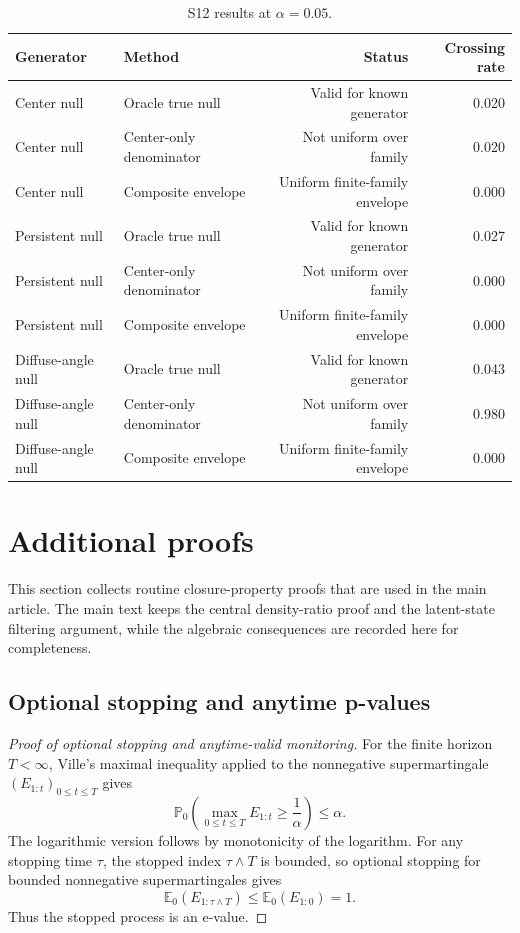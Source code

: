 \documentclass[pdflatex,sn-basic]{sn-jnl}
\newcommand{\E}{\mathbb E}
\newcommand{\Pbb}{\mathbb P}
\newcommand{\1}{\mathbf 1}
\begin{document}
\begin{table}[h]
\centering
\footnotesize
\begin{tabular}{@{}llrr@{}}
\toprule
Generator & Method & Status & Crossing rate \\
\midrule
Center null & Oracle true null & Valid for known generator & 0.020 \\
Center null & Center-only denominator & Not uniform over family & 0.020 \\
Center null & Composite envelope & Uniform finite-family envelope & 0.000 \\
Persistent null & Oracle true null & Valid for known generator & 0.027 \\
Persistent null & Center-only denominator & Not uniform over family & 0.000 \\
Persistent null & Composite envelope & Uniform finite-family envelope & 0.000 \\
Diffuse-angle null & Oracle true null & Valid for known generator & 0.043 \\
Diffuse-angle null & Center-only denominator & Not uniform over family & 0.980 \\
Diffuse-angle null & Composite envelope & Uniform finite-family envelope & 0.000 \\
\bottomrule
\end{tabular}
\caption{S12 results at $\alpha=0.05$.}
\label{tab:supp_s12}
\end{table}

\section{Additional proofs}
\label{sec:supp_proofs}

This section collects routine closure-property proofs that are used in the main article. The main text keeps the central density-ratio proof and the latent-state filtering argument, while the algebraic consequences are recorded here for completeness.

\subsection{Optional stopping and anytime p-values}

\begin{proof}[Proof of optional stopping and anytime-valid monitoring]
For the finite horizon $T<\infty$, Ville's maximal inequality applied to the nonnegative supermartingale $(E_{1:t})_{0\leq t\leq T}$ gives
\[
 \Pbb_0\left(\max_{0\leq t\leq T}E_{1:t}\geq \frac{1}{\alpha}\right)\leq \alpha.
\]
The logarithmic version follows by monotonicity of the logarithm. For any stopping time $\tau$, the stopped index $\tau\wedge T$ is bounded, so optional stopping for bounded nonnegative supermartingales gives
\[
 \E_0(E_{1:\tau\wedge T})\leq \E_0(E_{1:0})=1.
\]
Thus the stopped process is an e-value.
\end{proof}
\end{document}
